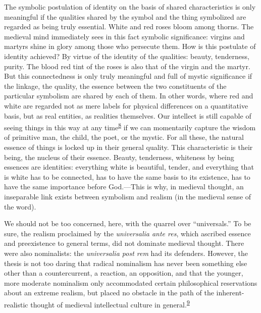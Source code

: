 The symbolic postulation of identity on the basis of shared
characteristics is only meaningful if the qualities shared by the symbol
and the thing symbolized are regarded as being truly essential. White
and red roses bloom among thorns. The medieval mind
\protect\hypertarget{16_Chapter_Nine__THE_DECLINE_OF_SYM.xhtmlux5cux23page_237}{}{}immediately
sees in this fact symbolic significance: virgins and martyrs shine in
glory among those who persecute them. How is this postulate of identity
achieved? By virtue of the identity of the qualities: beauty,
tenderness, purity. The blood red tint of the roses is also that of the
virgin and the martyr. But this connectedness is only truly meaningful
and full of mystic significance if the linkage, the quality, the essence
between the two constituents of the particular symbolism are shared by
each of them. In other words, where red and white are regarded not as
mere labels for physical differences on a quantitative basis, but as
real entities, as realities themselves. Our intellect is still capable
of seeing things in this way at any
time\textsuperscript{\protect\hypertarget{16_Chapter_Nine__THE_DECLINE_OF_SYM.xhtmlux5cux23id_777}{\protect\hyperlink{23_NOTES.xhtmlux5cux23id_778}{8}}}
if we can momentarily capture the wisdom of primitive man, the child,
the poet, or the mystic. For all these, the natural essence of things is
locked up in their general quality. This characteristic is their being,
the nucleus of their essence. Beauty, tenderness, whiteness by being
essences are identities: everything white is beautiful, tender, and
everything that is white has to be connected, has to have the same basis
to its existence, has to have the same importance before God.---This is
why, in medieval thought, an inseparable link exists between symbolism
and realism (in the medieval sense of the word).

We should not be too concerned, here, with the quarrel over
``universals.'' To be sure, the realism proclaimed by the
\emph{universalia ante res}, which ascribed essence and preexistence to
general terms, did not dominate medieval thought. There were also
nominalists: the \emph{universalia post rem} had its defenders. However,
the thesis is not too daring that radical nominalism has never been
something else other than a countercurrent, a reaction, an opposition,
and that the younger, more moderate nominalism only accommodated certain
philosophical reservations about an extreme realism, but placed no
obstacle in the path of the inherent-realistic thought of medieval
intellectual culture in
general.\textsuperscript{\protect\hypertarget{16_Chapter_Nine__THE_DECLINE_OF_SYM.xhtmlux5cux23id_775}{\protect\hyperlink{23_NOTES.xhtmlux5cux23id_776}{9}}}


